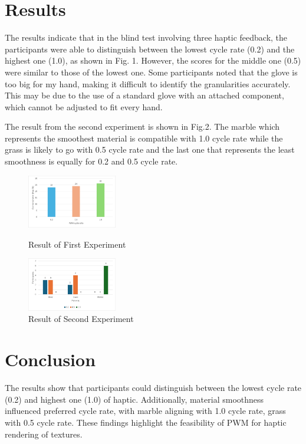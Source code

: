 \documentclass[a4paper,twocolumn]{article}
\begin{document}
\section{Results}
The results indicate that in the blind test involving three haptic feedback, the  participants were able to distinguish between the lowest cycle rate (0.2) and the highest one (1.0), as shown in Fig. 1. However, the scores for the middle one (0.5) were similar to those of the lowest one. Some participants noted that the glove is too big for my hand, making it difficult to identify the granularities accurately. This may be due to the use of a standard glove with an attached component, which cannot be adjusted to fit every hand.\par
The result from the second experiment is shown in Fig.2. The marble which represents the smoothest material is compatible with 1.0 cycle rate while the grass is likely to go with 0.5 cycle rate and the last one that represents the least smoothness is equally for 0.2 and 0.5 cycle rate.

\begin{figure}[h]
  \centering
  \includegraphics[width=0.35\textwidth]{./Fig/PWM_Correct_Test.png}
  \caption{{Result of First Experiment}}
  \label{fig1}
  \vspace{0.1cm}
  \centering
  \includegraphics[width=0.35\textwidth]{./Fig/Texture_Select_Test.png}
  \caption{{Result of Second Experiment}}
  \label{fig2}
\end{figure}


\section{Conclusion}
The results show that participants could distinguish between the lowest cycle rate (0.2) and highest one (1.0) of haptic. Additionally, material smoothness influenced preferred cycle rate, with marble aligning with 1.0 cycle rate, grass with 0.5 cycle rate. These findings highlight the feasibility of PWM for haptic rendering of textures.
\end{document}
